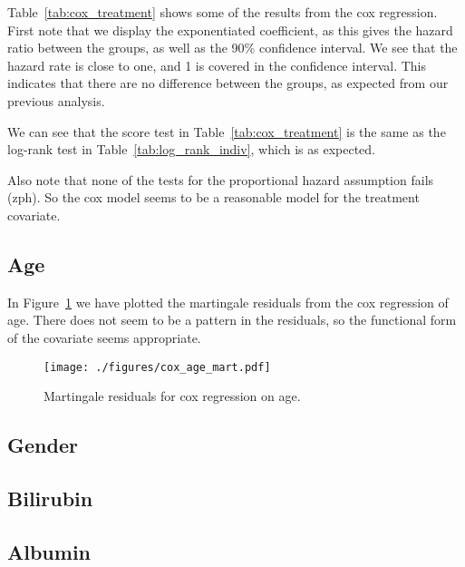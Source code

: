 \documentclass[11pt,a4paper]{article}
\begin{document}
Table~\ref{tab:cox_treatment} shows some of the results from the cox regression. First note that we display the exponentiated coefficient, as this gives the hazard ratio between the groups, as well as the 90\% confidence interval. We see that the hazard rate is close to one, and 1 is covered in the confidence interval. This indicates that there are no difference between the groups, as expected from our previous analysis.

We can see that the score test in Table~\ref{tab:cox_treatment} is the same as the log-rank test in Table~\ref{tab:log_rank_indiv}, which is as expected.

Also note that none of the tests for the proportional hazard assumption fails (zph).
So the cox model seems to be a reasonable model for the treatment covariate.




\subsection{Age}



In Figure~\ref{fig:cox_age_mart} we have plotted the martingale residuals from the cox regression of age. There does not seem to be a pattern in the residuals, so the functional form of the covariate seems appropriate.

\begin{figure}[h!tb]
    \begin{center}
        \texttt{[image: ./figures/cox\_age\_mart.pdf]}
    \end{center}
    \vspace{-0.8cm}
    \caption{Martingale residuals for cox regression on age.}
    \label{fig:cox_age_mart}
\end{figure}

\subsection{Gender}



\subsection{Bilirubin}



\subsection{Albumin}
\end{document}
